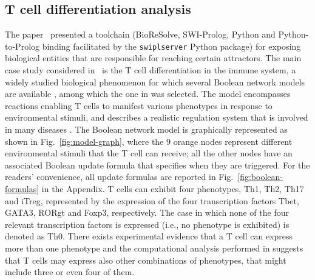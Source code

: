 

\subsection{T cell differentiation analysis}

The paper~\cite{datamod2023} presented a toolchain (BioReSolve, SWI-Prolog, Python and Python-to-Prolog binding facilitated by the \verb=swiplserver= Python package) for exposing  biological entities that are responsible for reaching certain attractors.
The main case study considered in~\cite{datamod2023} is the T cell differentiation in the immune system, a widely studied biological phenomenon for which several Boolean network models are available \cite{saez2007logical,thakar2010boolean,puniya2018mechanistic}, among which the one in \cite{puniya2018mechanistic} was selected. The model encompasses reactions enabling T cells to manifest various phenotypes in response to environmental stimuli, and describes a realistic regulation system that is involved in many diseases \cite{lafaille1998role,hirahara2016cd4+,meng2016regulatory}.
The Boolean network model is graphically represented as shown in Fig.~\ref{fig:model-graph}, where the 9 orange nodes represent different environmental stimuli that the T cell can receive; all the other nodes have an associated Boolean update formula that specifies when they are triggered. 
For the readers' convenience, all update formulas are reported in Fig.~\ref{fig:boolean-formulas} in the Appendix. 
T cells can exhibit four phenotypes, Th1, Th2, Th17 and iTreg, represented by the expression of the four transcription factors Tbet, GATA3, RORgt and Foxp3, respectively.
The case in which none of the four relevant transcription factors is expressed (i.e., no phenotype is exhibited) is denoted as Th0.
There exists experimental evidence that a T cell can express more than one phenotype \cite{luckheeram2012cd4+} and the computational analysis performed in \cite{puniya2018mechanistic} suggests that T cells may express also other combinations of phenotypes, that might include three or even four of them. 

